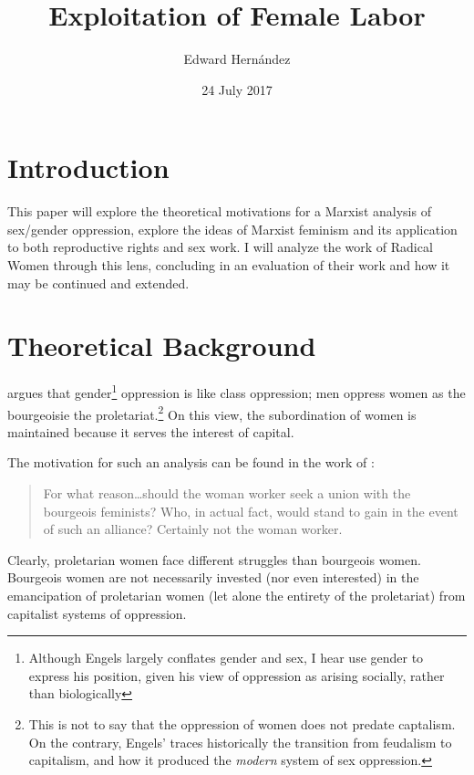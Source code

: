 \documentclass[man,12pt,natbib]{apa6}
\begin{document}
\title{Exploitation of Female Labor}
\author{Edward Hern\'{a}ndez}
\date{24 July 2017}
\maketitle


\section{Introduction}

This paper will explore the theoretical motivations for a Marxist analysis of
sex/gender oppression, explore the ideas of Marxist feminism and its
application to both reproductive rights and sex work. I will analyze the work
of Radical Women through this lens, concluding in an evaluation of their work
and how it may be continued and extended.

\section{Theoretical Background}

\citet{Engels84} argues that gender\footnote{Although Engels largely conflates
	gender and sex, I hear use gender to express his position, given his view
	of oppression as arising socially, rather than biologically} oppression is
like class oppression; men oppress women as the bourgeoisie the
proletariat.\footnote{This is not to say that the oppression of women does not
	predate captalism. On the contrary, Engels' traces historically the
	transition from feudalism to capitalism, and how it produced the
	\emph{modern} system of sex oppression.} On this view, the subordination of
women is maintained because it serves the interest of capital.

The motivation for such an analysis can be found in the work of
\citet{Kollontai09}:
\begin{quote}
	For what reason\ldots should the woman worker seek a union with the
	bourgeois feminists? Who, in actual fact, would stand to gain in the event
	of such an alliance? Certainly not the woman worker.
\end{quote}
Clearly, proletarian women face different struggles than bourgeois women.
Bourgeois women are not necessarily invested (nor even interested) in the
emancipation of proletarian women (let alone the entirety of the proletariat)
from capitalist systems of oppression.
\end{document}
